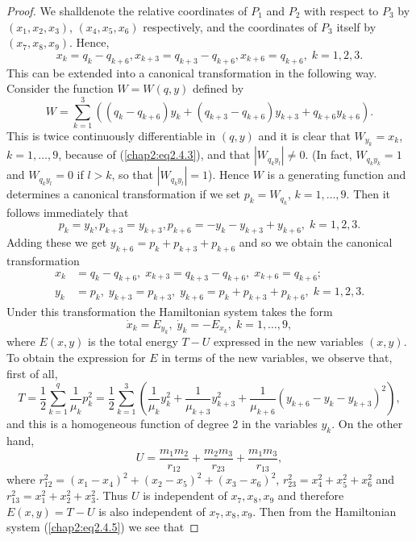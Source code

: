 \begin{proof}
We shall\pageoriginale denote the relative coordinates of $P_1$ and $P_2$ with respect to $P_3$ by $(x_1, x_2, x_3)$, $(x_4, x_5, x_6)$ respectively, and the coordinates of $P_3$ itself by $(x_7, x_8, x_9)$. Hence,
\begin{equation*}
x_k = q_k - q_{k+6}, x_{k+3} = q_{k+3} - q_{k+6} , x_{k+6} = q_{k+6}, \; k = 1,2,3.\tag{2.4.3}\label{chap2:eq2.4.3} 
\end{equation*}
This can be extended into a canonical transformation in the following way. Consider the function $W = W(q,y)$ defined by
$$
W = \sum\limits^3_{k=1} ((q_k - q_{k+6}) y_k + (q_{k+3} - q_{k+6}) y_{k+3} + q_{k+6} y_{k+6}).
$$
This is twice continuously differentiable in $(q,y)$ and it is clear that $W_{y_k} =  x_k$, $k =1, \ldots, 9$, because of (\ref{chap2:eq2.4.3}), and that $|W_{q_k y_l}| \neq 0$. (In fact, $W_{q_k y_k} =1$ and $W_{q_k y_l} = 0$ if $l>k$, so that $|W_{q_k y_l}| =1$). Hence $W$ is a generating function and determines a canonical transformation if we set $p_k = W_{q_k}$, $k = 1, \ldots, 9$. Then it follows immediately that
$$
p_k = y_k, p_{k+3} = y_{k+3}, p_{k+6} = - y_k -y_{k+3} + y_{k+6}, \; k = 1,2,3.
$$
Adding these we get $y_{k+6} = p_k + p_{k+3} + p_{k+6}$ and so we obtain the canonical transformation
\begin{align*}
x_k & = q_k - q_{k+6}, \; x_{k+3} = q_{k+3} - q_{k+6}, \; x_{k+6} = q_{k+6};\\
y_k & = p_k, \; y_{k+3} = p_{k+3}, \; y_{k+6} = p_k + p_{k+3} + p_{k+6}, \; k = 1,2,3. \tag{2.4.4}\label{chap2:eq2.4.4} 
\end{align*}
Under this transformation the Hamiltonian system takes the form
\begin{equation*}
\dot{x}_k = E_{y_k},\; \dot{y}_k = - E_{x_k}, \; k =1 , \ldots, 9, \tag{2.4.5}\label{chap2:eq2.4.5} 
\end{equation*}\pageoriginale
where $E(x,y)$ is the total energy $T-U$ expressed in the new variables $(x,y)$. To obtain the expression for $E$ in terms of the new variables, we observe that, first of all, 
$$
T = \frac{1}{2} \sum\limits^q_{k=1} \frac{1}{\mu_k} p^2_k = \frac{1}{2} \sum\limits^3_{k=1}  (\frac{1}{\mu_k} y^2_k + \frac{1}{\mu_{k+3}} y^2_{k+3} + \frac{1}{\mu_{k+6}} (y_{k+6} - y_k -y_{k+3})^2 ),
$$
and this is a homogeneous function of degree 2 in the variables $y_k$. On the other hand,
$$
U = \frac{m_1 m_2}{r_{12}} + \frac{m_2 m_3}{r_{23}} + \frac{m_1 m_3}{r_{13}},
$$
where $r^2_{12} = (x_1 - x_4)^2 + (x_2 -x_5)^2 + (x_3 - x_6)^2$, $r^2_{23} = x^2_4 + x^2_5 + x^2_6 $  and $r^2_{13} = x^2_1 + x^2_2 + x^2_3$. Thus $U$ is independent of $x_7, x_8, x_9$ and therefore $E(x,y) = T - U$ is also independent of $x_7, x_8, x_9$. Then from the Hamiltonian system (\ref{chap2:eq2.4.5}) we see that

\end{proof}
